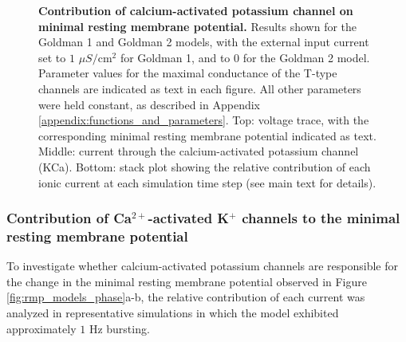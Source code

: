 \documentclass[../main.tex]{subfiles}
\begin{document}
{\begin{figure}[!t]
    \caption[Contribution of the calcium-activated potassium channel on the minimal resting membrane potential]{\textbf{Contribution of calcium-activated potassium channel on minimal resting membrane potential.} Results shown for the Goldman 1 and Goldman 2 models, with the external input current set to $1$ $\mu S/\text{cm}^2$ for Goldman 1, and to $0$ for the Goldman 2 model. Parameter values for the maximal conductance of the T-type channels are indicated as text in each figure. All other parameters were held constant, as described in Appendix \ref{appendix:functions_and_parameters}. Top: voltage trace, with the corresponding minimal resting membrane potential indicated as text. Middle: current through the calcium-activated potassium channel (KCa). Bottom: stack plot showing the relative contribution of each ionic current at each simulation time step (see main text for details).}
    \label{fig:rmp_models_contrib_fig_goldman}
\end{figure}
}



\subsubsection{Contribution of Ca$^{2+}$-activated K$^+$ channels to the minimal resting membrane potential}

\noindent To investigate whether calcium-activated potassium channels are responsible for the change in the minimal resting membrane potential observed in Figure \ref{fig:rmp_models_phase}a-b, the relative contribution of each current was analyzed in representative simulations in which the model exhibited approximately $1$ Hz bursting.
\end{document}
